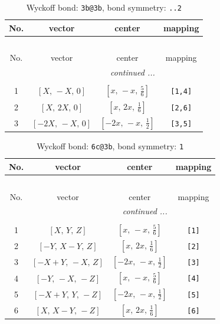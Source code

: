 \documentclass[fleqn,8pt]{jsarticle}
\begin{document}
\renewcommand{\arraystretch}{1.2}
\begin{longtable}{cccc}
\caption{Wyckoff bond: {\tt 3b@3b}, bond symmetry: {\tt ..2}}
 \\
 \hline \hline
No. & vector & center & mapping \\ \hline \endfirsthead

\multicolumn{3}{l}{\tablename\ \thetable{}} \\
 \hline \hline
No. & vector & center & mapping \\ \hline \endhead

 \hline \hline
\multicolumn{3}{r}{\footnotesize\it continued ...} \\ \endfoot

 \hline \hline
\multicolumn{3}{r}{} \\ \endlastfoot

1 & $\left[ X,\, - X,\, 0 \right]$ & $\left[ x,\, - x,\, \frac{5}{6} \right]$ & {\tt [1,4]} \\ \hline
2 & $\left[ X,\, 2 X,\, 0 \right]$ & $\left[ x,\, 2 x,\, \frac{1}{6} \right]$ & {\tt [2,6]} \\ \hline
3 & $\left[ - 2 X,\, - X,\, 0 \right]$ & $\left[ - 2 x,\, - x,\, \frac{1}{2} \right]$ & {\tt [3,5]} \\
\end{longtable}
\renewcommand{\arraystretch}{1.2}
\begin{longtable}{cccc}
\caption{Wyckoff bond: {\tt 6c@3b}, bond symmetry: {\tt 1}}
 \\
 \hline \hline
No. & vector & center & mapping \\ \hline \endfirsthead

\multicolumn{3}{l}{\tablename\ \thetable{}} \\
 \hline \hline
No. & vector & center & mapping \\ \hline \endhead

 \hline \hline
\multicolumn{3}{r}{\footnotesize\it continued ...} \\ \endfoot

 \hline \hline
\multicolumn{3}{r}{} \\ \endlastfoot

1 & $\left[ X,\, Y,\, Z \right]$ & $\left[ x,\, - x,\, \frac{5}{6} \right]$ & {\tt [1]} \\ \hline
2 & $\left[ - Y,\, X - Y,\, Z \right]$ & $\left[ x,\, 2 x,\, \frac{1}{6} \right]$ & {\tt [2]} \\ \hline
3 & $\left[ - X + Y,\, - X,\, Z \right]$ & $\left[ - 2 x,\, - x,\, \frac{1}{2} \right]$ & {\tt [3]} \\ \hline
4 & $\left[ - Y,\, - X,\, - Z \right]$ & $\left[ x,\, - x,\, \frac{5}{6} \right]$ & {\tt [4]} \\ \hline
5 & $\left[ - X + Y,\, Y,\, - Z \right]$ & $\left[ - 2 x,\, - x,\, \frac{1}{2} \right]$ & {\tt [5]} \\ \hline
6 & $\left[ X,\, X - Y,\, - Z \right]$ & $\left[ x,\, 2 x,\, \frac{1}{6} \right]$ & {\tt [6]} \\
\end{longtable}
\end{document}
